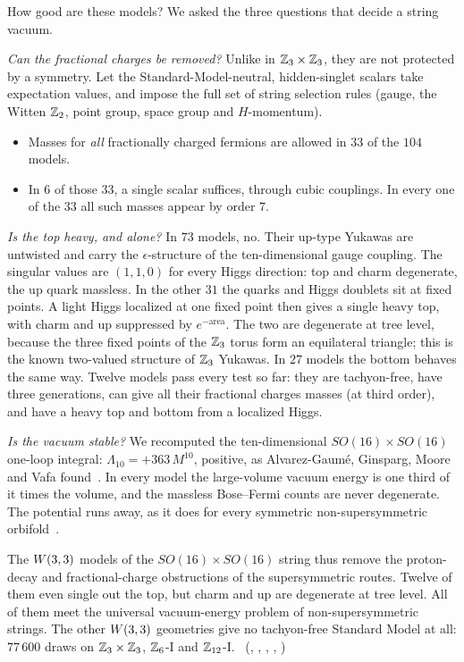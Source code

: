 How good are these models? We asked the three questions that decide a string vacuum.

\emph{Can the fractional charges be removed?} Unlike in $\mathbb{Z}_3\times\mathbb{Z}_3$, they are not protected by a symmetry.
Let the Standard-Model-neutral, hidden-singlet scalars take expectation values, and impose the full set of string
selection rules (gauge, the Witten $\mathbb{Z}_2$, point group, space group and $H$-momentum).
\begin{itemize}
\item Masses for \emph{all} fractionally charged fermions are allowed in $33$ of the $104$ models.
\item In $6$ of those $33$, a single scalar suffices, through cubic couplings. In every one of the $33$
      all such masses appear by order $7$.
\end{itemize}

\emph{Is the top heavy, and alone?} In $73$ models, no. Their up-type Yukawas are untwisted and carry the
$\epsilon$-structure of the ten-dimensional gauge coupling. The singular values are $(1,1,0)$ for every Higgs
direction: top and charm degenerate, the up quark massless. In the other $31$ the quarks and Higgs doublets sit at
fixed points. A light Higgs localized at one fixed point then gives a single heavy top, with charm and up suppressed
by $e^{-\mathrm{area}}$. The two are degenerate at tree level, because the three fixed points of the $\mathbb{Z}_3$ torus form
an equilateral triangle; this is the known two-valued structure of $\mathbb{Z}_3$ Yukawas. In $27$ models the bottom behaves
the same way. Twelve models pass every test so far: they are tachyon-free, have three generations, can give all their
fractional charges masses (at third order), and have a heavy top and bottom from a localized Higgs.

\emph{Is the vacuum stable?} We recomputed the ten-dimensional $SO(16)\times SO(16)$ one-loop integral:
$\Lambda_{10}=+363\,M^{10}$, positive, as Alvarez-Gaum\'e, Ginsparg, Moore and Vafa found~\cite{AGMV1986}. In every
model the large-volume vacuum energy is one third of it times the volume, and the massless Bose--Fermi counts are never
degenerate. The potential runs away, as it does for every symmetric non-supersymmetric orbifold~\cite{GrootNibbelink2017}.

The $W(3,3)$ models of the $SO(16)\times SO(16)$ string thus remove the proton-decay and fractional-charge obstructions of
the supersymmetric routes. Twelve of them even single out the top, but charm and up are degenerate at tree level. All of them meet
the universal vacuum-energy problem of non-supersymmetric strings. The other $W(3,3)$ geometries give no tachyon-free Standard Model at all: $77\,600$ draws on
$\mathbb{Z}_3\times\mathbb{Z}_3$, $\mathbb{Z}_6$-I and $\mathbb{Z}_{12}$-I.
\tierC\ (, ,
, ,
)

